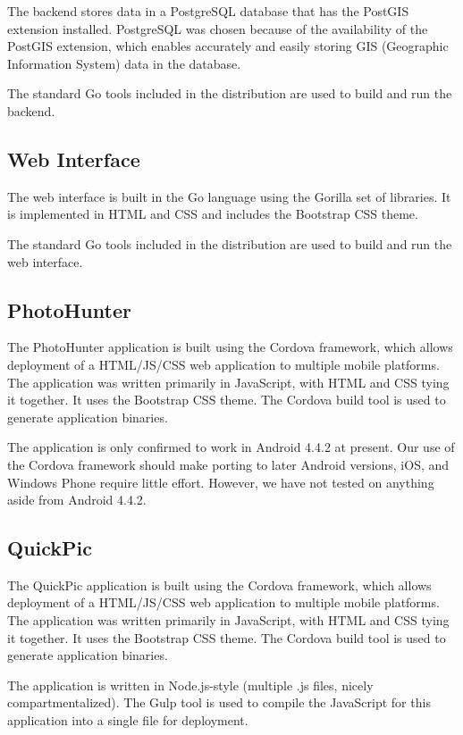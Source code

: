 \documentclass{article}
\begin{document}
The backend stores data in a PostgreSQL database that has the PostGIS extension
installed. PostgreSQL was chosen because of the availability of the PostGIS
extension, which enables accurately and easily storing GIS (Geographic
Information System) data in the database.

The standard Go tools included in the distribution are used to build and run
the backend.

\subsection{Web Interface}

The web interface is built in the Go language using the Gorilla set of
libraries. It is implemented in HTML and CSS and includes the
Bootstrap CSS theme.

The standard Go tools included in the distribution are used to build and run
the web interface.

\subsection{PhotoHunter}

The PhotoHunter application is built using the Cordova framework,
which allows deployment of a HTML/JS/CSS web application to multiple mobile
platforms. The application was written primarily in JavaScript, with HTML and
CSS tying it together. It uses the Bootstrap CSS theme. The Cordova build tool
is used to generate application binaries.

The application is only confirmed to work in Android 4.4.2 at present. Our use
of the Cordova framework should make porting to later Android versions, iOS,
and Windows Phone require little effort. However, we have not tested on
anything aside from Android 4.4.2.

\subsection{QuickPic}

The QuickPic application is built using the Cordova framework, which allows
deployment of a HTML/JS/CSS web application to multiple mobile platforms. The
application was written primarily in JavaScript, with HTML and CSS tying it
together. It uses the Bootstrap CSS theme. The Cordova build tool is used to
generate application binaries.

The application is written in Node.js-style (multiple .js files, nicely
compartmentalized). The Gulp tool is used to compile the JavaScript
for this application into a single file for deployment.
\end{document}
